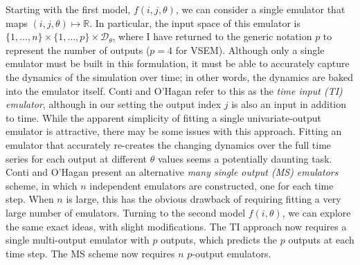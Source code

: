 \documentclass[12pt]{article}
\newcommand{\R}{\mathbb{R}}
\begin{document}
Starting with the first model, $f(i, j, \theta)$, we can consider a single emulator that maps $(i, j, \theta) \mapsto \R$. In particular, the input space of this 
emulator is $\{1, \dots, n\} \times \{1, \dots, p\} \times \mathcal{D}_{\theta}$, where I have returned to the generic notation $p$ to represent the number 
of outputs ($p = 4$ for VSEM). Although only a single emulator must be built in this formulation, it must be able to accurately capture the dynamics of the
simulation over time; in other words, the dynamics are baked into the emulator itself. Conti and O'Hagan \cite{Conti} refer to this as the 
\textit{time input (TI) emulator}, although in our setting the output index $j$ is also an input in addition to time. While the apparent simplicity of fitting a 
single univariate-output emulator is attractive, there may be some issues with this approach. Fitting an emulator that accurately re-creates the changing dynamics
over the full time series for each output at different $\theta$ values seems a potentially daunting task. Conti and O'Hagan present an alternative 
\textit{many single output (MS) emulators} scheme, in which $n$ independent emulators are constructed, one for each time step. When $n$ is large, this has the 
obvious drawback of requiring fitting a very large number of emulators. Turning to the second model $f(i, \theta)$, we can explore the same exact ideas, with slight modifications. 
The TI approach now requires a single multi-output 
emulator with $p$ outputs, which predicts the $p$ outputs at each time step. The MS scheme now requires $n$ $p$-output emulators. 
\end{document}
